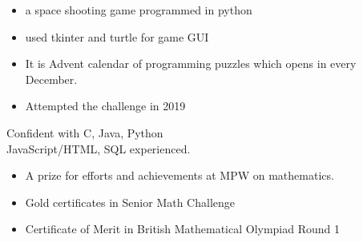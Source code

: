 \begin{itemize}

\item a space shooting game programmed in python
\item used tkinter and turtle for game GUI

\end{itemize}

\vspace{-3mm}
\divider
\vspace{-3mm}


\begin{itemize}

\item It is Advent calendar of programming puzzles which opens in every December.
\item Attempted the challenge in 2019

\end{itemize}


\vspace{-3mm}
\divider
\vspace{-3mm}



\vspace{-3mm}
\smallskip
{}
Confident with C, Java, Python \\
JavaScript/HTML, SQL experienced.





\begin{itemize}
\item A prize for efforts and achievements at MPW on mathematics.
\end{itemize} 


\vspace{-3mm}
\divider
\vspace{-3mm}



\begin{itemize}

\item Gold certificates in Senior Math Challenge
\item Certificate of Merit in British Mathematical Olympiad Round 1

\end{itemize} 

